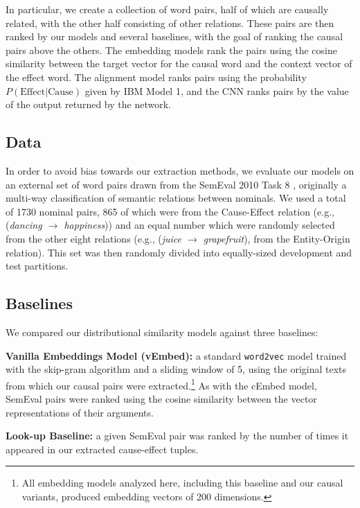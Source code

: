 In particular, we create a collection of word pairs, half of which are causally related, with the other half consisting of other relations. 
These pairs are then ranked by our models and several baselines, with the goal of ranking the causal pairs above the others. 
The embedding models rank the pairs using the cosine similarity between the target vector for the causal word and the context vector of the effect word.  The alignment model ranks pairs using the probability $P(\text{Effect}|\text{Cause})$ given by IBM Model 1, and the CNN ranks pairs by the value of the output returned by the network.

\subsection{Data}
In order to avoid bias towards our extraction methods, we evaluate our models on an external set of word pairs drawn from the SemEval 2010 Task 8 \citep{hendrickx2009semeval}, originally a multi-way classification of semantic relations between nominals.  We used a total of 1730 nominal pairs, 865 of which were from the Cause-Effect relation (e.g., (\emph{dancing $\rightarrow$ happiness})) and an equal number which were randomly selected from the other eight relations (e.g., (\emph{juice $\rightarrow$ grapefruit}), from the Entity-Origin relation).  This set was then randomly divided into equally-sized development and test partitions.

\subsection{Baselines}
We compared our distributional similarity models against three baselines:

{\flushleft \textbf{Vanilla Embeddings Model (vEmbed):}} a standard \texttt{word2vec} model trained with the skip-gram algorithm and a sliding window of 5, using the original texts from which our causal pairs were extracted.\footnote{All embedding models analyzed here, including this baseline and our causal variants, produced embedding vectors of 200 dimensions.} As with the cEmbed model, SemEval pairs were ranked using the cosine similarity between the vector representations of their arguments.

{\flushleft \textbf{Look-up Baseline:}} a given SemEval pair was ranked by the number of times it appeared in our extracted cause-effect tuples. 

